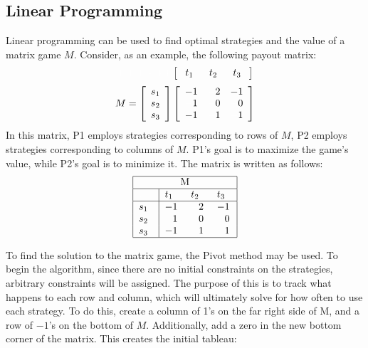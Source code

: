 \documentclass[11pt]{article}
\begin{document}
\subsection{Linear Programming}

Linear programming can be used to find optimal strategies and the value
of a matrix game $M$. Consider, as an example, the following payout
matrix:
\begin{equation*}
\setlength\arraycolsep{8pt}
\textcolor{white}{++++++}\left[ {\begin{array}{ccc}
t_1 & t_2 & t_3
\end{array} } \right]
\end{equation*}
\begin{equation*}
M= \left[ {\begin{array}{c}
s_1 \\
s_2 \\
s_3 \\
\end{array} } \right]
\left[ {\begin{array}{ccc}
-1 & \textcolor{white}{-}2 & -1\\
\textcolor{white}{-}1 & \textcolor{white}{-}0 & \textcolor{white}{-}0\\
-1 & \textcolor{white}{-}1 & \textcolor{white}{-}1\\
\end{array} } \right]
\end{equation*}
In this matrix, P1 employs strategies corresponding to rows of $M$, P2
employs strategies corresponding to columns of $M$. P1's goal is to
maximize the game's value, while P2's goal is to minimize it. The matrix is written as follows:
\begin{equation*}
\begin{tabular}{ |p{0.5cm}|p{0.5cm} p{0.5cm} p{0.5cm}|  }
\hline
\multicolumn{4}{|c|}{M} \\
\hline
\textcolor{white}{.}& $t_1$ & $t_2$ & $t_3$\\
\hline
$s_1$ & $-1$ & $\textcolor{white}{-}$2 & $-1$\\
$s_2$ & $\textcolor{white}{-}$1 & $\textcolor{white}{-}$0 & $\textcolor{white}{-}$0\\
$s_3$ & $-1$ & $\textcolor{white}{-}$1 & $\textcolor{white}{-}$1\\
\hline
\end{tabular}
\end{equation*}

To find the solution to the matrix game, the Pivot
method may be used. To begin the algorithm, since there are no initial constraints
on the strategies, arbitrary constraints will be assigned. The purpose
of this is to track what happens to each row and column, which will
ultimately solve for how often to use each strategy. To do this, create
a column of 1's on the far right side of M, and a row of $-1$'s on the
bottom of $M$. Additionally, add a zero in the new bottom corner of the
matrix. This creates the initial tableau:
\end{document}
